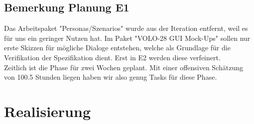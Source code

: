    	\subsection{Bemerkung Planung E1}
   	Das Arbeitspaket "Personas/Szenarios" wurde aus der Iteration entfernt, weil es für uns ein geringer Nutzen hat. Im Paket "VOLO-28 GUI Mock-Ups" sollen nur erste Skizzen für mögliche Dialoge entstehen, welche als Grundlage für die Verifikation der Spezifikation dient. Erst in E2 werden diese verfeinert.
	\\Zeitlich ist die Phase für zwei Wochen geplant. Mit einer offensiven Schätzung von 100.5 Stunden liegen haben wir also genug Tasks für diese Phase.

	\section{Realisierung}

